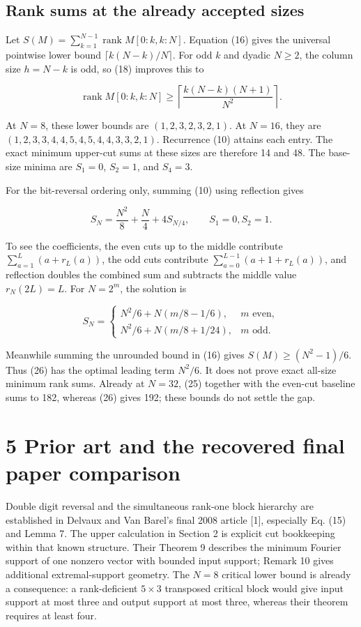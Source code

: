 \documentclass[
  11pt,
  letterpaper,
]{article}
\begin{document}
\subsection{Rank sums at the already accepted
sizes}\label{rank-sums-at-the-already-accepted-sizes}

Let \(S(M)=\sum_{k=1}^{N-1}\operatorname{rank}M[0:k,k:N]\). Equation
(16) gives the universal pointwise lower bound
\(\lceil k(N-k)/N\rceil\). For odd \(k\) and dyadic \(N\geq2\), the
column size \(h=N-k\) is odd, so (18) improves this to

\[
\operatorname{rank}M[0:k,k:N]\geq
\left\lceil\frac{k(N-k)(N+1)}{N^2}\right\rceil.              \tag{25}
\]

At \(N=8\), these lower bounds are \((1,2,3,2,3,2,1)\). At \(N=16\),
they are \((1,2,3,3,4,4,5,4,5,4,4,3,3,2,1)\). Recurrence (10) attains
each entry. The exact minimum upper-cut sums at these sizes are
therefore 14 and 48. The base-size minima are \(S_1=0\), \(S_2=1\), and
\(S_4=3\).

For the bit-reversal ordering only, summing (10) using reflection gives

\[
S_N=\frac{N^2}{8}+\frac N4+4S_{N/4},\qquad S_1=0, S_2=1.
\]

To see the coefficients, the even cuts up to the middle contribute
\(\sum_{a=1}^{L}(a+r_L(a))\), the odd cuts contribute
\(\sum_{a=0}^{L-1}(a+1+r_L(a))\), and reflection doubles the combined
sum and subtracts the middle value \(r_N(2L)=L\). For \(N=2^m\), the
solution is

\[
S_N=\begin{cases}
N^2/6+N(m/8-1/6),&m\text{ even},\\
N^2/6+N(m/8+1/24),&m\text{ odd}.
\end{cases}                                                  \tag{26}
\]

Meanwhile summing the unrounded bound in (16) gives
\(S(M)\geq(N^2-1)/6\). Thus (26) has the optimal leading term \(N^2/6\).
It does not prove exact all-size minimum rank sums. Already at \(N=32\),
(25) together with the even-cut baseline sums to 182, whereas (26) gives
192; these bounds do not settle the gap.

\section{5 Prior art and the recovered final paper
comparison}\label{prior-art-and-the-recovered-final-paper-comparison}

Double digit reversal and the simultaneous rank-one block hierarchy are
established in Delvaux and Van Barel's final 2008 article {[}1{]},
especially Eq. (15) and Lemma 7. The upper calculation in Section 2 is
explicit cut bookkeeping within that known structure. Their Theorem 9
describes the minimum Fourier support of one nonzero vector with bounded
input support; Remark 10 gives additional extremal-support geometry. The
\(N=8\) critical lower bound is already a consequence: a rank-deficient
\(5\times3\) transposed critical block would give input support at most
three and output support at most three, whereas their theorem requires
at least four.
\end{document}

